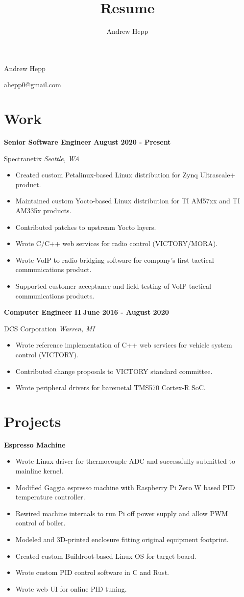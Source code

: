 \documentclass{article}
\title{Resume}
\author{Andrew Hepp}
\newcommand{\experience}[4]{
    \noindent \textbf{#1} \hfill \textbf{#2} \par
    \noindent #3 \hfill \textit{#4} \par
}
\begin{document}
    \begin{center}
       \Huge Andrew Hepp \normalsize
    \end{center}
    \hfill ahepp0@gmail.com

    \section*{Work}
        \experience{Senior Software Engineer}{August 2020 - Present}{Spectranetix}{Seattle, WA}
        \begin{itemize}
            \item Created custom Petalinux-based Linux distribution for Zynq Ultrascale+ product.
            \item Maintained custom Yocto-based Linux distribution for TI AM57xx and TI AM335x products.
            \item Contributed patches to upstream Yocto layers.
            \item Wrote C/C++ web services for radio control (VICTORY/MORA).
            \item Wrote VoIP-to-radio bridging software for company's first tactical communications product.
            \item Supported customer acceptance and field testing of VoIP tactical communications products.
        \end{itemize}

        \experience{Computer Engineer II}{June 2016 - August 2020}{DCS Corporation}{Warren, MI}
        \begin{itemize}
            \item Wrote reference implementation of C++ web services for vehicle system control (VICTORY).
            \item Contributed change proposals to VICTORY standard committee.
            \item Wrote peripheral drivers for baremetal TMS570 Cortex-R SoC.
        \end{itemize}

    \section*{Projects}
        \noindent \textbf{Espresso Machine}
        \begin{itemize}
            \item Wrote Linux driver for thermocouple ADC and successfully submitted to mainline kernel.
            \item Modified Gaggia espresso machine with Raspberry Pi Zero W based PID temperature controller.
            \item Rewired machine internals to run Pi off power supply and allow PWM control of boiler.
            \item Modeled and 3D-printed enclosure fitting original equipment footprint.
            \item Created custom Buildroot-based Linux OS for target board.
            \item Wrote custom PID control software in C and Rust.
            \item Wrote web UI for online PID tuning.
        \end{itemize}
\end{document}
